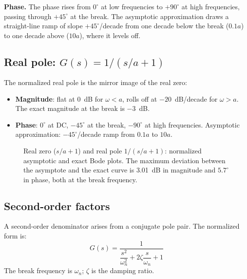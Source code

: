 \documentclass[../../book.tex]{subfiles}
\begin{document}
\textbf{Phase.}  The phase rises from $0^\circ$ at low frequencies to
$+90^\circ$ at high frequencies, passing through $+45^\circ$ at the break.
The asymptotic approximation draws a straight-line ramp of slope
$+45^\circ$/decade from one decade below the break ($0.1a$) to one decade
above ($10a$), where it levels off.

\subsection{Real pole: \texorpdfstring{$G(s) = 1/(s/a + 1)$}{G(s) = 1/(s/a + 1)}}
\label{sec:real_pole}

The normalized real pole is the mirror image of the real zero:
\begin{itemize}
  \item \textbf{Magnitude}: flat at 0~dB for $\omega < a$, rolls off at
    $-20$~dB/decade for $\omega > a$.  The exact magnitude at the break is
    $-3$~dB.
  \item \textbf{Phase}: $0^\circ$ at DC, $-45^\circ$ at the break, $-90^\circ$
    at high frequencies.  Asymptotic approximation: $-45^\circ$/decade ramp
    from $0.1a$ to $10a$.
\end{itemize}

\begin{figure}[htbp]
  \caption{Real zero ($s/a + 1$) and real pole $1/(s/a + 1)$: normalized
    asymptotic and exact Bode plots.  The maximum deviation between the
    asymptote and the exact curve is 3.01~dB in magnitude and $5.7^\circ$
    in phase, both at the break frequency.}
  \label{fig:blocks_za_1za}
\end{figure}

\subsection{Second-order factors}
\label{sec:second_order}

A second-order denominator arises from a conjugate pole pair.  The normalized
form is:
\begin{equation}
  G(s) = \frac{1}{\dfrac{s^2}{\omega_n^2} + 2\zeta\dfrac{s}{\omega_n} + 1}
  \label{eq:second_order_block}
\end{equation}
The break frequency is $\omega_n$; $\zeta$ is the damping ratio.
\end{document}
